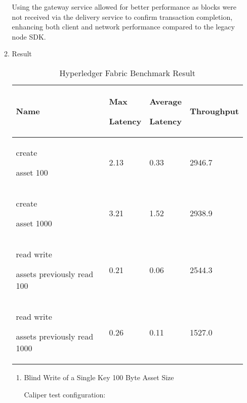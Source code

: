 \documentclass[conference]{IEEEtran}
\begin{document}
\begin{enumerate}[itemsep=2ex, parsep=1ex]
\begin{enumerate}[itemsep=2ex, parsep=1ex]
	      	      Using the gateway service allowed for better performance as blocks were
	      	      not received via the delivery service to confirm transaction completion,
	      	      enhancing both client and network performance compared to the legacy
	      	      node SDK.
	      	      	      	      
	      	      \clearpage
	      	      	      	      	      	      
	      	\item Result
	      	      	      	      	      	      
	      	      \begin{table}[h!]
	      	      	\caption{Hyperledger Fabric Benchmark Result}
	      	      	\def\arraystretch{1.4} \small
	      	      	\begin{tabular}{|p{1.7cm}|p{1.5cm}|p{1.5cm}|p{1.7cm}|}
	      	      		\hline
	      	      		Name                                        & Max \par Latency & Average \par Latency & Throughput \\
	      	      		\hline
	      	      		create \par asset 100                       & 2.13             & 0.33                 & 2946.7     \\
	      	      		\hline
	      	      		create \par asset 1000                      & 3.21             & 1.52                 & 2938.9     \\
	      	      		\hline
	      	      		read write \par assets previously read 100  & 0.21             & 0.06                 & 2544.3     \\
	      	      		\hline
	      	      		read write \par assets previously read 1000 & 0.26             & 0.11                 & 1527.0     \\
	      	      		\hline
	      	      	\end{tabular}
	      	      \end{table}
	      	      	      	      	      	      
	      	      \begin{enumerate}[itemsep=2ex, parsep=1ex]
	      	      	\item Blind Write of a Single Key 100 Byte Asset Size
	      	      	      	      	      	      	      	      	      
	      	      	      Caliper test configuration:
	      	      	      	      	      	      	      	      	      

\end{enumerate}
\end{enumerate}
\end{enumerate}
\end{document}
